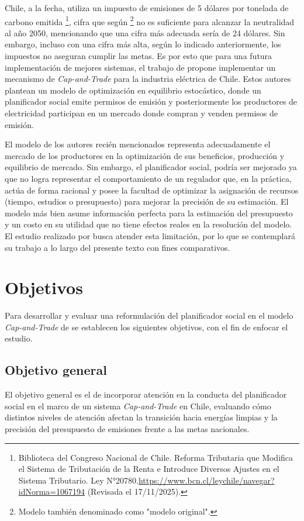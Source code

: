 Chile, a la fecha, utiliza un impuesto de emisiones de 5 dólares por tonelada de carbono emitida \footnote{Biblioteca del Congreso Nacional de Chile. Reforma Tributaria que Modifica el Sistema de Tributación de la Renta e Introduce Diversos Ajustes en el Sistema Tributario. Ley N°20780.\url{https://www.bcn.cl/leychile/navegar?idNorma=1067194} (Revisada el 17/11/2025).}, cifra que según \footnote{Modelo también denominado como "modelo original".} no es suficiente para alcanzar la neutralidad al año 2050, mencionando que una cifra más adecuada sería de 24 dólares. Sin embargo, incluso con una cifra más alta, según lo indicado anteriormente, los impuestos no aseguran cumplir las metas. Es por esto que para una futura implementación de mejores sistemas, el trabajo de  propone implementar un mecanismo de \emph{Cap-and-Trade} para la industria eléctrica de Chile. Estos autores plantean un modelo de optimización en equilibrio estocástico, donde un planificador social emite permisos de emisión y posteriormente los productores de electricidad participan en un mercado donde compran y venden permisos de emisión.\medskip

El modelo de los autores recién mencionados representa adecuadamente el mercado de los productores en la optimización de sus beneficios, producción y equilibrio de mercado. Sin embargo, el planificador social, podría ser mejorado ya que no logra representar el comportamiento de un regulador que, en la práctica, actúa de forma racional y posee la facultad de optimizar la asignación de recursos (tiempo, estudios o presupuesto) para mejorar la precisión de su estimación. El modelo más bien asume información perfecta para la estimación del presupuesto y un costo en su utilidad que no tiene efectos reales en la resolución del modelo. El estudio realizado por  busca atender esta limitación, por lo que se contemplará su trabajo a lo largo del presente texto con fines comparativos.\medskip

\section{Objetivos}
Para desarrollar y evaluar una reformulación del planificador social en el modelo \textit{Cap-and-Trade} de  se establecen los siguientes objetivos, con el fin de enfocar el estudio.\medskip

\subsection{Objetivo general}
El objetivo general es el de incorporar atención en la conducta del planificador social en el marco de un sistema \textit{Cap-and-Trade} en Chile, evaluando cómo distintos niveles de atención afectan la transición hacia energías limpias y la precisión del presupuesto de emisiones frente a las metas nacionales. \medskip
